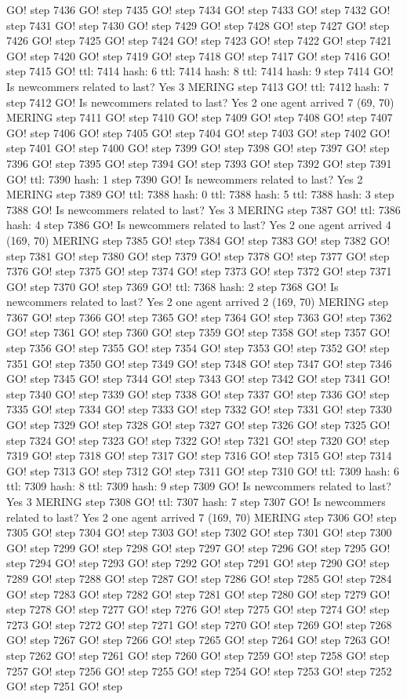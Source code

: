 GO! step 7436 GO! step 7435 GO! step 7434 GO! step 7433 GO! step 7432 GO! step 7431 GO! step 7430 GO! step 7429 GO! step 7428 GO! step 7427 GO! step 7426 GO! step 7425 GO! step 7424 GO! step 7423 GO! step 7422 GO! step 7421 GO! step 7420 GO! step 7419 GO! step 7418 GO! step 7417 GO! step 7416 GO! step 7415 GO! ttl: 7414 hash: 6 ttl: 7414 hash: 8 ttl: 7414 hash: 9 step 7414 GO! Is newcommers related to last? Yes 3 MERING step 7413 GO! ttl: 7412 hash: 7 step 7412 GO! Is newcommers related to last? Yes 2 one agent arrived 7 (69, 70) MERING step 7411 GO! step 7410 GO! step 7409 GO! step 7408 GO! step 7407 GO! step 7406 GO! step 7405 GO! step 7404 GO! step 7403 GO! step 7402 GO! step 7401 GO! step 7400 GO! step 7399 GO! step 7398 GO! step 7397 GO! step 7396 GO! step 7395 GO! step 7394 GO! step 7393 GO! step 7392 GO! step 7391 GO! ttl: 7390 hash: 1 step 7390 GO! Is newcommers related to last? Yes 2 MERING step 7389 GO! ttl: 7388 hash: 0 ttl: 7388 hash: 5 ttl: 7388 hash: 3 step 7388 GO! Is newcommers related to last? Yes 3 MERING step 7387 GO! ttl: 7386 hash: 4 step 7386 GO! Is newcommers related to last? Yes 2 one agent arrived 4 (169, 70) MERING step 7385 GO! step 7384 GO! step 7383 GO! step 7382 GO! step 7381 GO! step 7380 GO! step 7379 GO! step 7378 GO! step 7377 GO! step 7376 GO! step 7375 GO! step 7374 GO! step 7373 GO! step 7372 GO! step 7371 GO! step 7370 GO! step 7369 GO! ttl: 7368 hash: 2 step 7368 GO! Is newcommers related to last? Yes 2 one agent arrived 2 (169, 70) MERING step 7367 GO! step 7366 GO! step 7365 GO! step 7364 GO! step 7363 GO! step 7362 GO! step 7361 GO! step 7360 GO! step 7359 GO! step 7358 GO! step 7357 GO! step 7356 GO! step 7355 GO! step 7354 GO! step 7353 GO! step 7352 GO! step 7351 GO! step 7350 GO! step 7349 GO! step 7348 GO! step 7347 GO! step 7346 GO! step 7345 GO! step 7344 GO! step 7343 GO! step 7342 GO! step 7341 GO! step 7340 GO! step 7339 GO! step 7338 GO! step 7337 GO! step 7336 GO! step 7335 GO! step 7334 GO! step 7333 GO! step 7332 GO! step 7331 GO! step 7330 GO! step 7329 GO! step 7328 GO! step 7327 GO! step 7326 GO! step 7325 GO! step 7324 GO! step 7323 GO! step 7322 GO! step 7321 GO! step 7320 GO! step 7319 GO! step 7318 GO! step 7317 GO! step 7316 GO! step 7315 GO! step 7314 GO! step 7313 GO! step 7312 GO! step 7311 GO! step 7310 GO! ttl: 7309 hash: 6 ttl: 7309 hash: 8 ttl: 7309 hash: 9 step 7309 GO! Is newcommers related to last? Yes 3 MERING step 7308 GO! ttl: 7307 hash: 7 step 7307 GO! Is newcommers related to last? Yes 2 one agent arrived 7 (169, 70) MERING step 7306 GO! step 7305 GO! step 7304 GO! step 7303 GO! step 7302 GO! step 7301 GO! step 7300 GO! step 7299 GO! step 7298 GO! step 7297 GO! step 7296 GO! step 7295 GO! step 7294 GO! step 7293 GO! step 7292 GO! step 7291 GO! step 7290 GO! step 7289 GO! step 7288 GO! step 7287 GO! step 7286 GO! step 7285 GO! step 7284 GO! step 7283 GO! step 7282 GO! step 7281 GO! step 7280 GO! step 7279 GO! step 7278 GO! step 7277 GO! step 7276 GO! step 7275 GO! step 7274 GO! step 7273 GO! step 7272 GO! step 7271 GO! step 7270 GO! step 7269 GO! step 7268 GO! step 7267 GO! step 7266 GO! step 7265 GO! step 7264 GO! step 7263 GO! step 7262 GO! step 7261 GO! step 7260 GO! step 7259 GO! step 7258 GO! step 7257 GO! step 7256 GO! step 7255 GO! step 7254 GO! step 7253 GO! step 7252 GO! step 7251 GO! step 